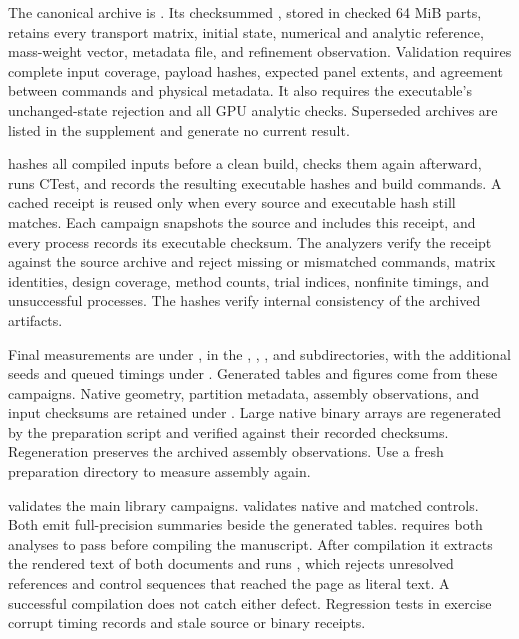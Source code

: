 \documentclass[10pt]{article}
\begin{document}
The canonical archive is . Its checksummed
, stored in checked 64 MiB parts, retains every transport matrix, initial state, numerical
and analytic reference, mass-weight vector, metadata file, and refinement
observation. Validation requires complete input coverage, payload hashes,
expected panel extents, and agreement between commands and physical metadata.
It also requires the executable's unchanged-state rejection and all GPU
analytic checks. Superseded archives are listed in the supplement and
generate no current result.

 hashes all compiled inputs before a
clean build, checks them again afterward, runs CTest, and records the
resulting executable hashes and build commands. A cached receipt is
reused only when every source and executable hash still matches. Each
campaign snapshots the source and includes this receipt, and every
process records its executable checksum. The analyzers verify the
receipt against the source archive and reject missing or mismatched
commands, matrix identities, design coverage, method counts, trial
indices, nonfinite timings, and unsuccessful processes. The hashes verify internal consistency of the archived artifacts.

Final measurements are under , in the
, , , and 
subdirectories, with the additional seeds and queued timings under
. Generated tables
and figures come from these campaigns. Native geometry, partition metadata,
assembly observations, and input checksums are retained under
. Large native binary arrays are regenerated by the
preparation script and verified against their recorded checksums.
Regeneration preserves the archived assembly observations. Use a fresh
preparation directory to measure assembly again.

 validates the main library campaigns.
 validates native and matched controls.
Both emit full-precision summaries beside the generated tables.
 requires both analyses to pass before
compiling the manuscript. After compilation it extracts the rendered text of
both documents and runs , which rejects
unresolved references and control sequences that reached the page as literal
text. A successful compilation does not catch either defect.
Regression tests in 
exercise corrupt timing records and stale source or binary receipts.
\end{document}
